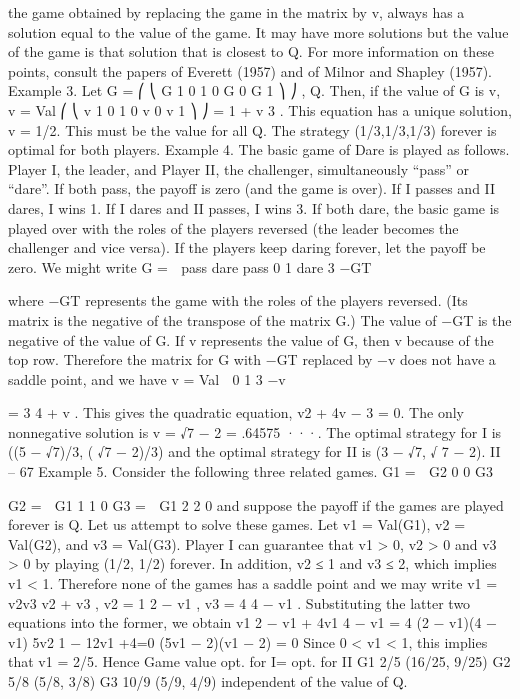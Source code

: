 \documentclass[]{report}
\begin{document}
the game obtained by replacing the game in the matrix by v, always has a solution equal
to the value of the game. It may have more solutions but the value of the game is that
solution that is closest to Q. For more information on these points, consult the papers of
Everett (1957) and of Milnor and Shapley (1957).
Example 3. Let
G =
⎛
⎝
G 1 0
1 0 G
0 G 1
⎞
⎠ , Q.
Then, if the value of G is v,
v = Val
⎛
⎝
v 1 0
1 0 v
0 v 1
⎞
⎠ = 1 + v
3 .
This equation has a unique solution, v = 1/2. This must be the value for all Q. The
strategy (1/3,1/3,1/3) forever is optimal for both players.
Example 4. The basic game of Dare is played as follows. Player I, the leader, and Player
II, the challenger, simultaneously “pass” or “dare”. If both pass, the payoff is zero (and
the game is over). If I passes and II dares, I wins 1. If I dares and II passes, I wins 3. If
both dare, the basic game is played over with the roles of the players reversed (the leader
becomes the challenger and vice versa). If the players keep daring forever, let the payoff
be zero. We might write
G =

pass dare
pass 0 1
dare 3 −GT

where −GT represents the game with the roles of the players reversed. (Its matrix is the
negative of the transpose of the matrix G.) The value of −GT is the negative of the value
of G.
If v represents the value of G, then v  because of the top row. Therefore the matrix
for G with −GT replaced by −v does not have a saddle point, and we have
v = Val  0 1
3 −v

= 3
4 + v
.
This gives the quadratic equation, v2 + 4v − 3 = 0. The only nonnegative solution is
v = √7 − 2 = .64575 ···. The optimal strategy for I is ((5 − √7)/3, (
√7 − 2)/3) and the
optimal strategy for II is (3 − √7,
√
7 − 2).
II – 67
Example 5. Consider the following three related games.
G1 =
 G2 0
0 G3

G2 =
 G1 1
1 0
G3 =
 G1 2
2 0
and suppose the payoff if the games are played forever is Q. Let us attempt to solve these
games. Let v1 = Val(G1), v2 = Val(G2), and v3 = Val(G3). Player I can guarantee that
v1 > 0, v2 > 0 and v3 > 0 by playing (1/2, 1/2) forever. In addition, v2 ≤ 1 and v3 ≤ 2,
which implies v1 < 1. Therefore none of the games has a saddle point and we may write
v1 = v2v3
v2 + v3
, v2 = 1
2 − v1
, v3 = 4
4 − v1
.
Substituting the latter two equations into the former, we obtain
v1
2 − v1
+
4v1
4 − v1
= 4
(2 − v1)(4 − v1)
5v2
1 − 12v1 +4=0
(5v1 − 2)(v1 − 2) = 0
Since 0 < v1 < 1, this implies that v1 = 2/5. Hence
Game value opt. for I= opt. for II
G1 2/5 (16/25, 9/25)
G2 5/8 (5/8, 3/8)
G3 10/9 (5/9, 4/9)
independent of the value of Q.
\end{document}

